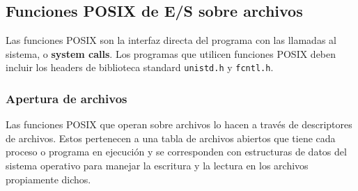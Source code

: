 % 

\subsection{Funciones POSIX de E/S sobre archivos}
\label{subsec:esarchivosposix}

Las funciones POSIX son la interfaz directa del programa con las llamadas al
sistema, o \textbf{system calls}. Los programas que utilicen funciones POSIX deben incluir los headers de
biblioteca standard \lstinline{unistd.h} y \lstinline{fcntl.h}.
 

\subsubsection{Apertura de archivos}
Las funciones POSIX que operan sobre archivos lo hacen
a través de descriptores de archivos. Estos pertenecen a una tabla de archivos
abiertos que tiene cada proceso o programa en ejecución y se corresponden con
estructuras de datos del sistema operativo para manejar la escritura y la
lectura en los archivos propiamente dichos.

